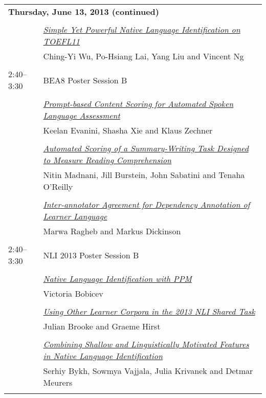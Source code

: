 \begin{tabular}{p{20mm}p{138mm}}
\\
\multicolumn{2}{l}{\bf Thursday, June 13, 2013
 (continued)} \\\\
 & \hyperlink{page.152}{\em Simple Yet Powerful Native Language Identification on TOEFL11}\\
         & Ching-Yi Wu, Po-Hsiang Lai, Yang Liu and Vincent Ng \\
\\

2:40--3:30 & BEA8 Poster Session B
 \\
\\
 & \hyperlink{page.157}{\em Prompt-based Content Scoring for Automated Spoken Language Assessment}\\
         & Keelan Evanini, Shasha Xie and Klaus Zechner \\
\\

 & \hyperlink{page.163}{\em Automated Scoring of a Summary-Writing Task Designed to Measure Reading Comprehension}\\
         & Nitin Madnani, Jill Burstein, John Sabatini and Tenaha O'Reilly \\
\\

 & \hyperlink{page.169}{\em Inter-annotator Agreement for Dependency Annotation of Learner Language}\\
         & Marwa Ragheb and Markus Dickinson \\
\\

2:40--3:30 & NLI 2013 Poster Session B
 \\
\\
 & \hyperlink{page.180}{\em Native Language Identification with PPM}\\
         & Victoria Bobicev \\
\\

 & \hyperlink{page.188}{\em Using Other Learner Corpora in the 2013 NLI Shared Task}\\
         & Julian Brooke and Graeme Hirst \\
\\

 & \hyperlink{page.197}{\em Combining Shallow and Linguistically Motivated Features in Native Language Identification}\\
         & Serhiy Bykh, Sowmya Vajjala, Julia Krivanek and Detmar Meurers \\
\\


\end{tabular}
